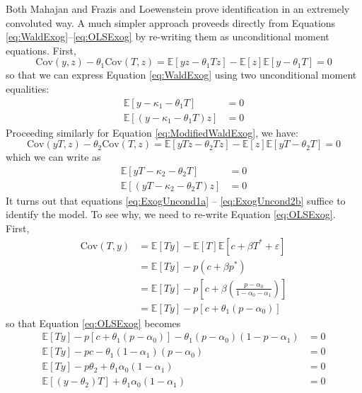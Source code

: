 \documentclass[12pt]{article}
\begin{document}
Both Mahajan and Frazis and Loewenstein prove identification in an extremely convoluted way.
A much simpler approach proveeds directly from Equations \ref{eq:WaldExog}--\ref{eq:OLSExog} by re-writing them as unconditional moment equations.
First,
\[
  \mbox{Cov}(y,z) - \theta_1 \mbox{Cov}(T,z) = \mathbb{E}\left[ yz - \theta_1 Tz \right] - \mathbb{E}[z]\mathbb{E}[y - \theta_1 T] = 0
\]
so that we can express Equation \ref{eq:WaldExog} using two unconditional moment equalities:
\begin{align}
  \label{eq:ExogUncond1a}
  \mathbb{E}\left[ y - \kappa_1 - \theta_1 T \right] &= 0 \\
  \label{eq:ExogUncond1b}
  \mathbb{E}\left[ (y - \kappa_1 - \theta_1 T) z \right] &= 0 
\end{align}
Proceeding similarly for Equation \ref{eq:ModifiedWaldExog}, we have:
\[
  \mbox{Cov}(yT,z) - \theta_2 \mbox{Cov}(T,z) = \mathbb{E}\left[ yTz - \theta_2 Tz \right] - \mathbb{E}[z]\mathbb{E}\left[ yT - \theta_2 T \right] = 0
\]
which we can write as
\begin{align}
  \label{eq:ExogUncond2a}
  \mathbb{E}\left[ yT - \kappa_2 - \theta_2 T \right] &= 0 \\
  \label{eq:ExogUncond2b}
  \mathbb{E}\left[ (yT - \kappa_2 - \theta_2 T) z \right] &= 0 
\end{align}
It turns out that equations \ref{eq:ExogUncond1a} -- \ref{eq:ExogUncond2b} suffice to identify the model.
To see why, we need to re-write Equation \ref{eq:OLSExog}.
First, 
\begin{align*}
  \mbox{Cov}(T,y) &= \mathbb{E}[Ty] - \mathbb{E}[T]\mathbb{E}[c + \beta T^* + \varepsilon]\\
  &= \mathbb{E}[Ty] - p(c + \beta p^*)\\
  &= \mathbb{E}[Ty] - p\left[ c + \beta \left(\frac{p - \alpha_0}{1 - \alpha_0 - \alpha_1} \right) \right]\\
  &= \mathbb{E}[Ty] - p\left[ c + \theta_1 \left( p - \alpha_0 \right) \right]
\end{align*}
so that Equation \ref{eq:OLSExog} becomes
\begin{align*}
  \mathbb{E}[Ty] - p\left[ c + \theta_1(p - \alpha_0) \right] - \theta_1(p-\alpha_0)(1 - p - \alpha_1) &= 0\\
  \mathbb{E}[Ty] - pc - \theta_1 (1 - \alpha_1)(p - \alpha_0) &= 0\\
  \mathbb{E}[Ty] - p \theta_2 + \theta_1 \alpha_0 (1 - \alpha_1) &= 0\\
  \mathbb{E}[(y - \theta_2)T] + \theta_1 \alpha_0 (1 - \alpha_1) &= 0
\end{align*}
\end{document}
